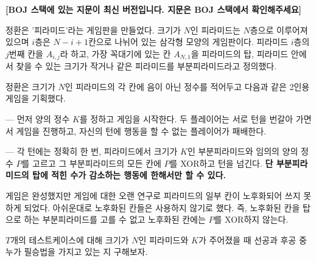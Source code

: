 \textbf{[BOJ 스택에 있는 지문이 최신 버전입니다. 지문은 BOJ 스택에서 확인해주세요]}


정환은 '피라미드'라는 게임판을 만들었다. 크기가 $N$인 피라미드는 $N$층으로 이루어져 있으며 $i$층은 $N-i+1$칸으로 나뉘어 있는 삼각형 모양의 게임판이다. 피라미드 $i$층의 $j$번째 칸을 $A_{i,j}$라 하고, 가장 꼭대기에 있는 칸 $A_{N,1}$을 피라미드의 탑, 피라미드 안에서 찾을 수 있는 크기가 작거나 같은 피라미드를 부분피라미드라고 정의했다.

정환은 크기가 $N$인 피라미드의 각 칸에 음이 아닌 정수를 적어두고 다음과 같은 2인용 게임을 기획했다.

--- 먼저 양의 정수 $K$를 정하고 게임을 시작한다. 두 플레이어는 서로 턴을 번갈아 가면서 게임을 진행하고, 자신의 턴에 행동을 할 수 없는 플레이어가 패배한다.

--- 각 턴에는 정확히 한 번, 피라미드에서 크기가 $K$인 부분피라미드와 임의의 양의 정수 $P$를 고르고 그 부분피라미드의 모든 칸에 $P$를 XOR하고 턴을 넘긴다. \textbf{단 부분피라미드의 탑에 적힌 수가 감소하는 행동에 한해서만 할 수 있다.}

게임은 완성했지만 게임에 대한 오랜 연구로 피라미드의 일부 칸이 노후화되어 쓰지 못하게 되었다. 아쉬운대로 노후화된 칸들은 사용하지 않기로 했다. 즉, 노후화된 칸을 탑으로 하는 부분피라미드를 고를 수 없고 노후화된 칸에는 $P$를 XOR하지 않는다.

$T$개의 테스트케이스에 대해 크기가 $N$인 피라미드와 $K$가 주어졌을 때 선공과 후공 중 누가 필승법을 가지고 있는 지 구해보자.
